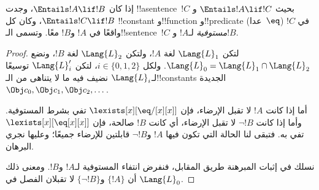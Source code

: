 \documentclass[../../../include/open-logic-section]{subfiles}
\begin{document}


\begin{thm}
إذا كان $\Entails !A \lif !B$، وجدت !!a{sentence}~$!C$ بحيث
$\Entails !A \lif !C$ و$\Entails !C \lif !B$، وكان كل !!{constant}
و!!{function} و!!{predicate} (عدا~$\eq$) في $!C$ واقعًا في $!A$ و$!B$
معًا. وتسمى الـ!!{sentence}~$!C$ \emph{مستوفية} لـ$!A$ و$!B$.
\end{thm}

\begin{proof}
لتكن $\Lang{L}_1$ لغة $!A$، ولتكن $\Lang{L}_2$ لغة $!B$، ونضع
$\Lang{L}_0 = \Lang{L}_1 \cap \Lang{L}_2$. ولكل
$i \in \{0,1,2\}$، لتكن $\Lang{L}'_i$ توسيعًا لـ$\Lang{L}_i$ نضيف فيه
ما لا يتناهى من الـ!!{constant}s الجديدة
$\Obj c_0, \Obj c_1, \Obj c_2, \dots$.

أما إذا كانت $!A$ لا تقبل الإرضاء، فإن
$\lexists[x][\eq/[x][x]]$ تفي بشرط المستوفية. وأما إذا كانت $\lnot !B$ لا تقبل
الإرضاء، أي كانت $!B$ صالحة، فإن
$\lexists[x][\eq[x][x]]$ تفي به. فتبقى لنا الحالة التي تكون فيها $!A$
و$\lnot !B$ قابلتين للإرضاء جميعًا؛ وعليها نجري البرهان.

نسلك في إثبات المبرهنة طريق المقابل، فنفرض انتفاء المستوفية لـ$!A$
و$!B$. ومعنى ذلك أن $\{!A\}$ و$\{\lnot !B\}$ لا تقبلان
الفصل في $\Lang{L}_0$.


\end{proof}
\end{document}

